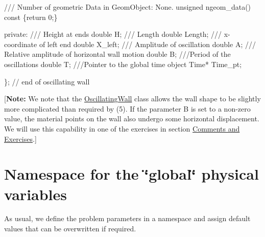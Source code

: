 \begin{DoxyCodeInclude}
 \textcolor{comment}{}
\textcolor{comment}{ /// Number of geometric Data in GeomObject: None.}
\textcolor{comment}{} \textcolor{keywordtype}{unsigned} ngeom\_data()\textcolor{keyword}{ const }\{\textcolor{keywordflow}{return} 0;\}              

\textcolor{keyword}{private}:
 \textcolor{comment}{}
\textcolor{comment}{ /// Height at ends}
\textcolor{comment}{} \textcolor{keywordtype}{double} H;
\textcolor{comment}{}
\textcolor{comment}{ /// Length}
\textcolor{comment}{} \textcolor{keywordtype}{double} Length;
\textcolor{comment}{}
\textcolor{comment}{ /// x-coordinate of left end}
\textcolor{comment}{} \textcolor{keywordtype}{double} X\_left;
\textcolor{comment}{}
\textcolor{comment}{ /// Amplitude of oscillation}
\textcolor{comment}{} \textcolor{keywordtype}{double} A;
\textcolor{comment}{}
\textcolor{comment}{ /// Relative amplitude of horizontal wall motion}
\textcolor{comment}{} \textcolor{keywordtype}{double} B;
\textcolor{comment}{}
\textcolor{comment}{ ///Period of the oscillations}
\textcolor{comment}{} \textcolor{keywordtype}{double} T;
\textcolor{comment}{}
\textcolor{comment}{ ///Pointer to the global time object}
\textcolor{comment}{} Time* Time\_pt;

\}; \textcolor{comment}{// end of oscillating wall}

\end{DoxyCodeInclude}


\mbox{[}{\bfseries Note\+:} We note that the {\ttfamily \hyperlink{classOscillatingWall}{Oscillating\+Wall}} class allows the wall shape to be slightly more complicated than required by (5). If the parameter {\ttfamily B} is set to a non-\/zero value, the material points on the wall also undergo some horizontal displacement. We will use this capability in one of the exercises in section \hyperlink{index_comments}{Comments and Exercises}.\mbox{]}



 

 \hypertarget{index_variables}{}\section{Namespace for the \char`\"{}global\char`\"{} physical variables}\label{index_variables}
As usual, we define the problem parameters in a namespace and assign default values that can be overwritten if required.

